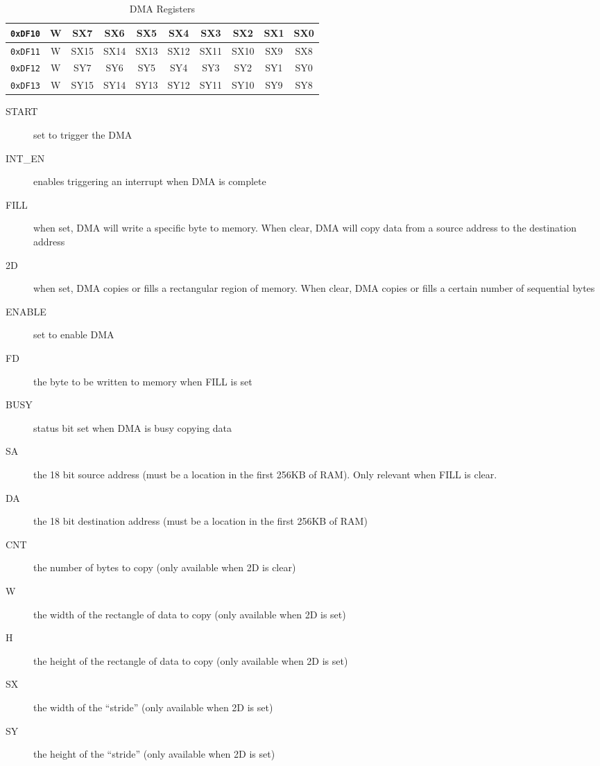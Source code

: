 \begin{table}[h]
\begin{center}
\begin{tabular}{|c|c|c|c|c|c|c|c|c|c|}
            \verb+0xDF10+ & W & SX7 & SX6 & SX5 & SX4 & SX3 & SX2 & SX1 & SX0 \\ \hline
            \verb+0xDF11+ & W & SX15 & SX14 & SX13 & SX12 & SX11 & SX10 & SX9 & SX8 \\ \hline

            \verb+0xDF12+ & W & SY7 & SY6 & SY5 & SY4 & SY3 & SY2 & SY1 & SY0 \\ \hline
            \verb+0xDF13+ & W & SY15 & SY14 & SY13 & SY12 & SY11 & SY10 & SY9 & SY8 \\ \hline
        \end{tabular}
    \end{center}
    \caption{DMA Registers}
    \label{tab:dma_reg}
\end{table}

\begin{description}
    \item[START] set to trigger the DMA

    \item[INT\_EN] enables triggering an interrupt when DMA is complete

    \item[FILL] when set, DMA will write a specific byte to memory. When clear, DMA will copy data from a source address to the destination address

    \item[2D] when set, DMA copies or fills a rectangular region of memory. When clear, DMA copies or fills a certain number of sequential bytes

    \item[ENABLE] set to enable DMA

    \item[FD] the byte to be written to memory when FILL is set

    \item[BUSY] status bit set when DMA is busy copying data

    \item[SA] the 18 bit source address (must be a location in the first 256KB of RAM). Only relevant when FILL is clear.

    \item[DA] the 18 bit destination address (must be a location in the first 256KB of RAM)

    \item[CNT] the number of bytes to copy (only available when 2D is clear)

    \item[W] the width of the rectangle of data to copy (only available when 2D is set)

    \item[H] the height of the rectangle of data to copy (only available when 2D is set)

    \item[SX] the width of the ``stride'' (only available when 2D is set)

    \item[SY] the height of the ``stride'' (only available when 2D is set)
\end{description}
